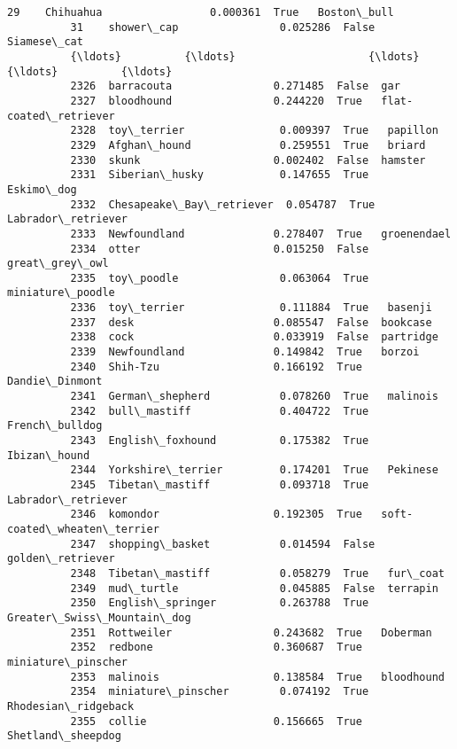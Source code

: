 \documentclass[11pt]{article}
\begin{document}
\begin{Verbatim}[commandchars=\\\{\}]
          29    Chihuahua                 0.000361  True   Boston\_bull                   
          31    shower\_cap                0.025286  False  Siamese\_cat                   
          {\ldots}          {\ldots}                     {\ldots}    {\ldots}          {\ldots}                   
          2326  barracouta                0.271485  False  gar                           
          2327  bloodhound                0.244220  True   flat-coated\_retriever         
          2328  toy\_terrier               0.009397  True   papillon                      
          2329  Afghan\_hound              0.259551  True   briard                        
          2330  skunk                     0.002402  False  hamster                       
          2331  Siberian\_husky            0.147655  True   Eskimo\_dog                    
          2332  Chesapeake\_Bay\_retriever  0.054787  True   Labrador\_retriever            
          2333  Newfoundland              0.278407  True   groenendael                   
          2334  otter                     0.015250  False  great\_grey\_owl                
          2335  toy\_poodle                0.063064  True   miniature\_poodle              
          2336  toy\_terrier               0.111884  True   basenji                       
          2337  desk                      0.085547  False  bookcase                      
          2338  cock                      0.033919  False  partridge                     
          2339  Newfoundland              0.149842  True   borzoi                        
          2340  Shih-Tzu                  0.166192  True   Dandie\_Dinmont                
          2341  German\_shepherd           0.078260  True   malinois                      
          2342  bull\_mastiff              0.404722  True   French\_bulldog                
          2343  English\_foxhound          0.175382  True   Ibizan\_hound                  
          2344  Yorkshire\_terrier         0.174201  True   Pekinese                      
          2345  Tibetan\_mastiff           0.093718  True   Labrador\_retriever            
          2346  komondor                  0.192305  True   soft-coated\_wheaten\_terrier   
          2347  shopping\_basket           0.014594  False  golden\_retriever              
          2348  Tibetan\_mastiff           0.058279  True   fur\_coat                      
          2349  mud\_turtle                0.045885  False  terrapin                      
          2350  English\_springer          0.263788  True   Greater\_Swiss\_Mountain\_dog    
          2351  Rottweiler                0.243682  True   Doberman                      
          2352  redbone                   0.360687  True   miniature\_pinscher            
          2353  malinois                  0.138584  True   bloodhound                    
          2354  miniature\_pinscher        0.074192  True   Rhodesian\_ridgeback           
          2355  collie                    0.156665  True   Shetland\_sheepdog             
          

\end{Verbatim}
\end{document}
